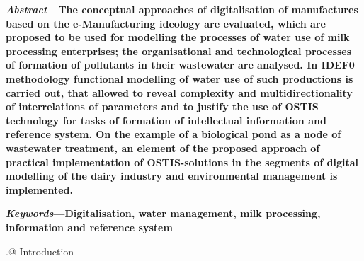 \documentclass[a4paper]{article}
\makeatletter
\newcommand*{\rom}[1]{\expandafter\@slowromancap\romannumeral #1@}
\makeatother
\begin{document}
\begin{multicols}{2}
\normalsize{\begin{spacing}{0.1}

{\textbf{ %
\fontsize{10}{19}\selectfont
\textit{Abstract}—The conceptual approaches of digitalisation of
manufactures based on the e-Manufacturing ideology are
evaluated, which are proposed to be used for modelling
the processes of water use of milk processing enterprises;
the organisational and technological processes of formation
of pollutants in their wastewater are analysed. In IDEF0
methodology functional modelling of water use of such
productions is carried out, that allowed to reveal complexity
and multidirectionality of interrelations of parameters and
to justify the use of OSTIS technology for tasks of formation
of intellectual information and reference system. On the
example of a biological pond as a node of wastewater
treatment, an element of the proposed approach of practical
implementation of OSTIS-solutions in the segments of
digital modelling of the dairy industry and environmental
management is implemented.
}
\par\textbf{\textit{Keywords}—Digitalisation, water management, milk processing, information and reference system }}
\end{spacing}}
 \vskip 1cm
\begin{center}
\rom{1.} Introduction
\end{center}
 


\end{multicols}
\end{document}
